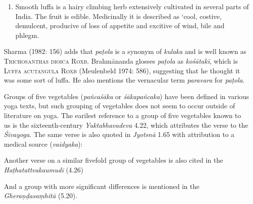 \begin{ekdosis}
\begin{philcomm}[hp01_062]
\begin{enumerate}
\item Smooth luffa is a hairy climbing herb extensively cultivated in several parts of India. The fruit is edible. Medicinally it is described as `cool, costive, demulcent, producive of loss of appetite and excitive of wind, bile and phlegm.
\end{enumerate}
Sharma (1982: 156) adds that \emph{paṭola} is a synonym of \emph{kulaka} and is well known as \textsc{Trichosanthas dioica Roxb.} Brahmānanda glosses \emph{paṭola} as \emph{kośātakī}, which is \textsc{Luffa acutangula Roxb} (Meulenbeld 1974: 586), suggesting that he thought it was some sort of luffa. He also mentions the vernacular term \emph{paravara} for \emph{paṭola}.

Groups of five vegetables (\emph{pañcaśāka} or \emph{śākapañcaka}) have been defined in various yoga texts, but such grouping of vegetables does not seem to occur outside of literature on yoga. The earilest reference to a group of five vegetables known to us is the sixteenth-century \emph{Yuktabhavadeva} 4.22, which attributes the verse to the \emph{Śivayoga}. The same verse is also quoted in \emph{Jyotsnā} 1.65 with attribution to a medical source (\emph{vaidyaka}):

\begin{quote}
\begin{versinnote}
\end{versinnote}
\end{quote}
Another verse on a similar fivefold group of vegetables is also cited in the \emph{Haṭhatattvakaumudī} (4.26)
\begin{quote}
\begin{versinnote}
\end{versinnote}
\end{quote}
And a group with more significant differences is mentioned in the \emph{Gheraṇḍasaṃhitā} (5.20).
\begin{quote}
\begin{versinnote}
\end{versinnote}
\end{quote}


\end{philcomm}
\end{ekdosis}
